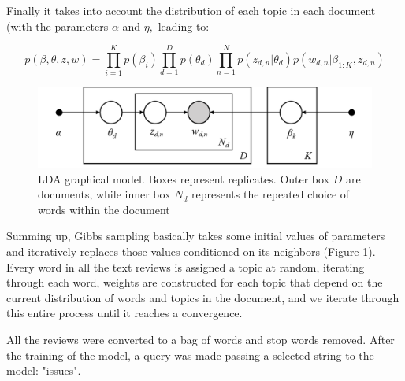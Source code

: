 Finally it takes into account the distribution of each topic in each document (with the parameters $\alpha$ and $\eta,$ leading to:

\[p(\beta,\theta,z,w)=
\prod_{i=1}^K p(\beta_{i}) \prod_{d=1}^D p(\theta_{d}) \prod_{n=1}^N p(z_{d,n}|\theta_{d}) p(w_{d,n}|\beta_{1:K},z_{d,n})\]
 
 \begin{figure}
	\includegraphics[width=1\linewidth]{figs/01/LDA}
	\caption{LDA graphical model. Boxes represent replicates. Outer box $D$ are documents, while inner box $N_d$ represents the repeated choice of words within the document}
	\label{LDA_graph}
\end{figure}

\newpage
Summing up, Gibbs sampling\cite{mcauley2015} basically takes some initial values of parameters and iteratively replaces those values conditioned on its neighbors (Figure \ref{LDA_graph}). Every word in all the text reviews is assigned a topic at random, iterating through each word, weights are constructed for each topic that depend on the current distribution of words and topics in the document, and we iterate through this entire process until it reaches a convergence.

All the reviews were converted to a bag of words and stop words removed. After the training of the model, a query was made passing a selected string to the model: "issues".

